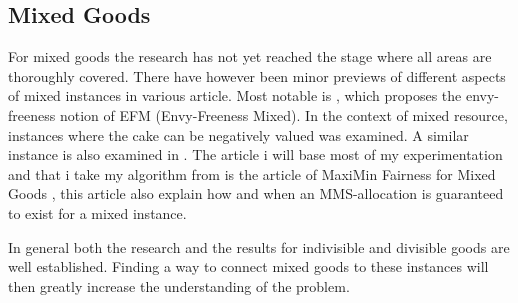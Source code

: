 \subsection{Mixed Goods}\label{subsec:mixed-goods}
For mixed goods the research has not yet reached the stage where all areas are thoroughly covered. There have however been minor previews of different aspects of mixed instances in various article. Most notable is \cite{mixed-goods}, which proposes the envy-freeness notion of EFM (Envy-Freeness Mixed). In the context of mixed resource\cite{mixed-resources}, instances where the cake can be negatively valued was examined. A similar instance is also examined in \cite{mixed-manna}. The article i will base most of my experimentation and that i take my algorithm from is the article of MaxiMin Fairness for Mixed Goods \cite{mms}, this article also explain how and when an MMS-allocation is guaranteed to exist for a mixed instance.











In general both the research and the results for indivisible and divisible goods are well established. Finding a way to connect mixed goods to these instances will then greatly increase the understanding of the problem.